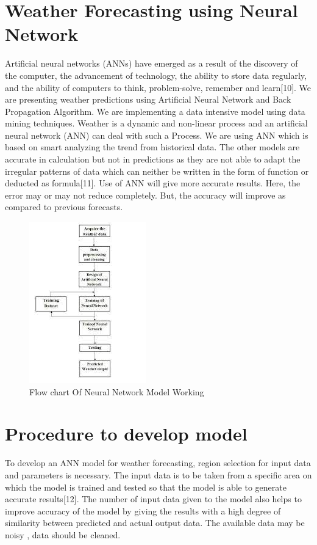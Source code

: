 \section{Weather Forecasting using Neural Network}
Artificial neural networks (ANNs) have emerged as a result of the discovery of the computer, the advancement of technology, the ability to store data regularly, and the ability of computers to think, problem-solve, remember and learn[10]. We are presenting weather predictions using Artificial Neural Network and Back Propagation Algorithm. We are implementing a data intensive model using data mining techniques. Weather is a dynamic and non-linear process and an artificial neural network (ANN) can deal with such a Process. 
We are using ANN which is based on smart analyzing the trend from historical data. The other models are accurate in calculation but not in predictions as they are not able to adapt the irregular patterns of data which can neither be written in the form of function or deducted as formula[11].
Use of ANN will give more accurate results. Here, the error may or may not reduce completely. But, the accuracy will improve as compared to previous forecasts.
\begin{figure}[hbt!]
  \centering
  \includegraphics[width=0.5 \linewidth]{images/outputs/imageeee.jpeg}
  \caption{Flow chart Of Neural Network Model Working}
\end{figure}
 

\section{ Procedure to develop model}
To develop an ANN model for weather forecasting, region selection for input data and parameters is necessary. The input data is to be taken from a specific area on which the model is trained and tested so that the model is able to generate accurate results[12]. The number of input data given to the model also helps to improve accuracy of the model by giving the results with a high degree of similarity between predicted and actual output data. The available data may be noisy , data should be cleaned. 

